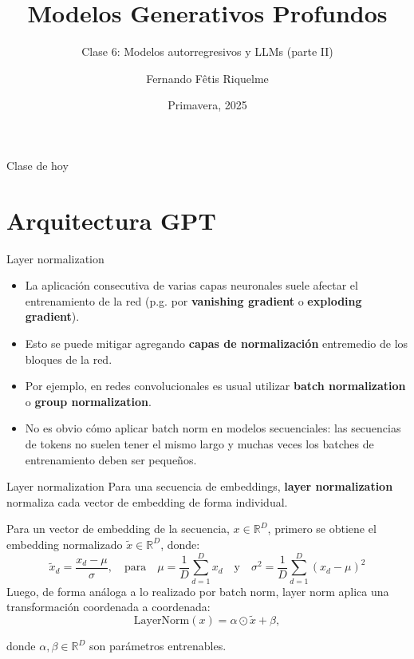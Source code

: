 \documentclass{beamer}
\title{Modelos Generativos Profundos}
\subtitle{Clase 6: Modelos autorregresivos y LLMs (parte II)}
\author{Fernando Fêtis Riquelme}
\institute{
    Facultad de Ciencias Físicas y Matemáticas\\
    Universidad de Chile
}
\date{Primavera, 2025}
\newcommand{\R}{\mathbb{R}}
\begin{document}
\begin{frame}
    \titlepage
\end{frame}

\begin{frame}{Clase de hoy}
    \tableofcontents
\end{frame}

\section{Arquitectura GPT}

\begin{frame}{Layer normalization}

    \begin{itemize}
        \item La aplicación consecutiva de varias capas neuronales suele afectar el entrenamiento de la red (p.g. por \textbf{vanishing gradient} o \textbf{exploding gradient}).
        \item Esto se puede mitigar agregando \textbf{capas de normalización} entremedio de los bloques de la red.
        \item Por ejemplo, en redes convolucionales es usual utilizar \textbf{batch normalization} o \textbf{group normalization}.
        \item No es obvio cómo aplicar batch norm en modelos secuenciales: las secuencias de tokens no suelen tener el mismo largo y muchas veces los batches de entrenamiento deben ser pequeños.
    \end{itemize}

\end{frame}

\begin{frame}{Layer normalization}
    Para una secuencia de embeddings, \textbf{layer normalization} normaliza cada vector de embedding de forma individual.

    Para un vector de embedding de la secuencia, $x\in\R^{D}$, primero se obtiene el embedding normalizado $\tilde x\in\R^D$, donde:
    \begin{equation*}
        \tilde x_d = \frac{x_d - \mu}{\sigma},
        \quad\text{para}\quad
        \mu = \frac{1}{D} \sum_{d=1}^{D} x_d
        \quad\text{y}\quad
        \sigma^2 = \frac{1}{D} \sum_{d=1}^{D} (x_d - \mu)^2
    \end{equation*}
    Luego, de forma análoga a lo realizado por batch norm, layer norm aplica una transformación coordenada a coordenada:
    \begin{equation*}
        \text{LayerNorm}(x) = \alpha \odot \tilde x + \beta,
    \end{equation*}

    donde $\alpha,\beta\in\R^D$ son parámetros entrenables.

\end{frame}
\end{document}
